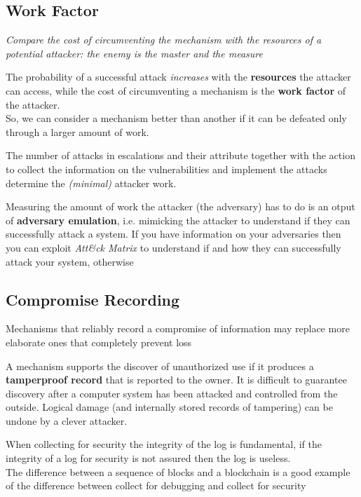 \subsection{Work Factor}
\begin{center}
   \textit{Compare the cost of circumventing the mechanism with the resources
   of a potential attacker:
   the enemy is the master and the measure}
\end{center}

The probability of a successful attack \textit{increases} with the \textbf{resources} the attacker can access,
while the cost of circumventing a mechanism is the \textbf{work factor} of the attacker.\\
So, we can consider a mechanism better than another if it can be defeated only through a larger amount of work.

The number of attacks in escalations and their attribute together with the action to collect the information on the vulnerabilities and implement the attacks determine the \textit{(minimal)} attacker work.

Measuring the amount of work the attacker (the adversary) has to do is an otput of \textbf{adversary emulation}, i.e. mimicking the attacker to understand if they can successfully attack a system.
If you have information on your adversaries then you can exploit \textit{Att\&ck Matrix} to understand if and
how they can successfully attack your system,
otherwise

\subsection{Compromise Recording}
\begin{center}
   Mechanisms that reliably record a compromise of information may replace more elaborate ones that completely prevent loss
\end{center}
A mechanism supports the discover of unauthorized use if it produces a \textbf{tamperproof record} that is reported to the owner.
It is difficult to guarantee discovery after a computer system has been attacked and controlled from the outside.
Logical damage (and internally stored records of tampering) can be undone by a clever attacker.

When collecting for security the integrity of the log is
fundamental, if the integrity of a log for security is not assured then the
log is useless.\\
The difference between a sequence of blocks and a
blockchain is a good example of the difference between
collect for debugging and collect for security

